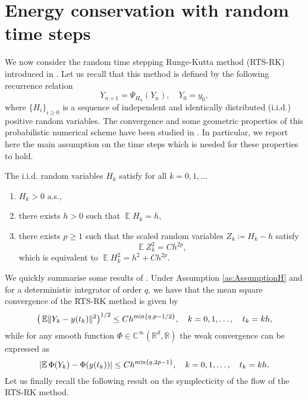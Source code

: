 \documentclass{siamart1116}
\numberwithin{theorem}{section}
\DeclarePairedDelimiter{\abs}{\lvert}{\rvert}
\DeclarePairedDelimiter{\norm}{\|}{\|}
\newcommand{\R}{\mathbb{R}}
\newcommand{\C}{\mathbb{C}}
\newcommand{\defeq}{\coloneqq}
\newcommand{\E}{\operatorname{\mathbb{E}}}
\begin{document}
\section{Energy conservation with random time steps}\label{sec:RTSBEA} We now consider the random time stepping Runge-Kutta method (RTS-RK) introduced in \cite{AbG18}. Let us recall that this method is defined by the following recurrence relation
\begin{equation}\label{eq:RTSRK}
	Y_{n+1} = \Psi_{H_n}(Y_n), \quad Y_0 = y_0,
\end{equation}
where $\{H_i\}_{i\geq 0}$ is a sequence of independent and identically distributed (i.i.d.) positive random variables. The convergence and some geometric properties of this probabilistic numerical scheme have been studied in \cite{AbG18}. In particular, we report here the main assumption on the time steps which is needed for these properties to hold.
\begin{assumption}\label{as:AssumptionH} The i.i.d. random variables $H_k$ satisfy for all $k = 0, 1, \ldots$
	\begin{enumerate}
		\item\label{as:hStrong_Pos} $H_k > 0$ a.s.,
		\item\label{as:hStrong_E} there exists $h > 0$ such that $\E H_k = h$,
		\item\label{as:hStrong_Var} there exists $p \geq 1$ such that the scaled random variables $Z_k \defeq H_k - h$ satisfy
		\begin{equation}
		\E Z_k^2 = Ch^{2p},
		\end{equation}
		which is equivalent to $\E H_k^2 = h^2 + Ch^{2p}$.
	\end{enumerate}
\end{assumption}
We quickly summarise some results of \cite{AbG18}. Under Assumption \ref{as:AssumptionH} and for a deterministic integrator of order $q$, we have that the mean square convergence of the RTS-RK method is given by
\begin{equation}
	\big(\E\norm{Y_k - y(t_k)}^2\big)^{1/2}	\leq Ch^{\min\{q, p-1/2\}}, \quad k = 0, 1, \ldots, \quad t_k = kh,
\end{equation} 
while for any smooth function $\Phi \in \C^{\infty}(\R^d, \R)$ the weak convergence can be expressed as
\begin{equation}
	\abs{\E \Phi(Y_k) - \Phi(y(t_k))} \leq Ch^{\min\{q, 2p-1\}}, \quad k = 0, 1, \ldots, \quad t_k = kh.
\end{equation}
Let us finally recall the following result on the symplecticity of the flow of the RTS-RK method.
\end{document}
